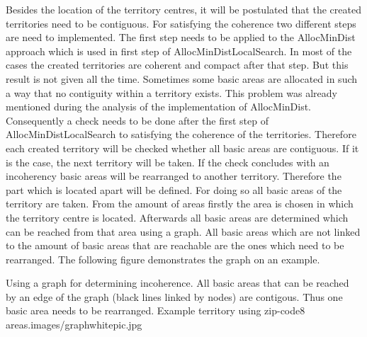 Besides the location of the territory centres, it will be postulated that the created territories need to be contiguous. For satisfying the coherence two different steps are need to implemented. The first step needs to be applied to the AllocMinDist approach which is used in first step of AllocMinDistLocalSearch. In most of the cases the created territories are coherent and compact after that step. But this result is not given all the time. Sometimes some basic areas are allocated in such a way that no contiguity within a territory exists. This problem was already mentioned during the analysis of the implementation of AllocMinDist. Consequently a check needs to be done after the first step of AllocMinDistLocalSearch to satisfying the coherence of the territories. Therefore each created territory will be checked whether all basic areas are contiguous. If it is the case, the next territory will be taken. If the check concludes with an incoherency basic areas will be rearranged to another territory. Therefore the part which is located apart will be defined. For doing so all basic areas of the territory are taken. From the amount of areas firstly the area is chosen in which the territory centre is located. Afterwards all basic areas are determined which can be reached from that area using a graph. All basic areas which are not linked to the amount of basic areas that are reachable are the ones which need to be rearranged. The following figure demonstrates the graph on an example.

\begin{figureOwn}{Using a graph for determining incoherence. All basic areas that can be reached by an edge of the graph (black lines linked by nodes) are contigous. Thus one basic area needs to be rearranged. Example territory using zip-code8 areas.}{images/graphwhitepic.jpg}\end{figureOwn}

